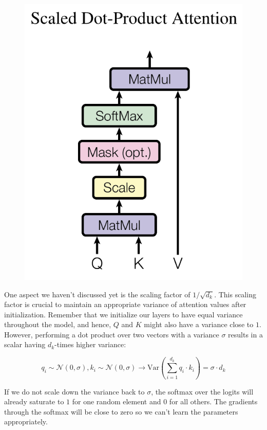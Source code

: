 \begin{figure}[ht]
    \centering
    \includegraphics[scale=0.4]{figures/scaled_attention.png}
\end{figure}



One aspect we haven't discussed yet is the scaling factor of $1/\sqrt{d_k}$.
This scaling factor is crucial to maintain an appropriate variance of attention values after initialization.
Remember that we initialize our layers to have equal variance throughout the model, and hence,
$Q$ and $K$ might also have a variance close to $1$.
However, performing a dot product over two vectors with a variance $\sigma$ results
in a scalar having $d_k$-times higher variance:

$$q_i \sim \mathcal{N}(0,\sigma), k_i \sim \mathcal{N}(0,\sigma) \to \text{Var}\left(\sum_{i=1}^{d_k} q_i\cdot k_i\right) = \sigma\cdot d_k$$


If we do not scale down the variance back to $\sigma$, the softmax over the logits will already saturate
to $1$ for one random element and $0$ for all others.
The gradients through the softmax will be close to zero so we can't learn the parameters appropriately.

